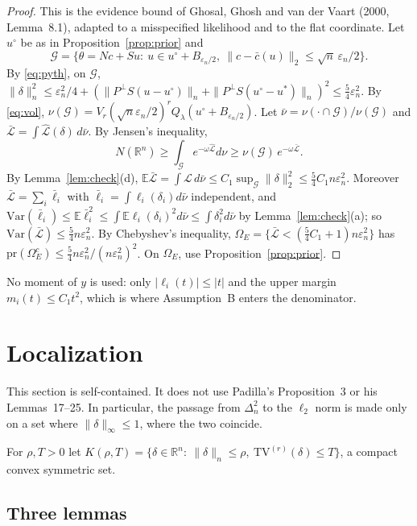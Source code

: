 \documentclass[11pt]{article}
\theoremstyle{definition}
\theoremstyle{remark}
\newcommand{\R}{\mathbb{R}}
\newcommand{\E}{\mathbb{E}}
\newcommand{\pr}{\mathrm{pr}}
\newcommand{\TV}{\mathrm{TV}}
\newcommand{\om}{\omega}
\newcommand{\en}{\varepsilon_n}
\newcommand{\Lh}{\widehat{\mathcal L}}
\newcommand{\Lm}{\mathcal L}
\newcommand{\Ql}{Q_\lambda}
\newcommand{\Pp}{P^{\perp}}
\newcommand{\nn}[1]{\|#1\|_n}
\begin{document}
\begin{proof}
This is the evidence bound of Ghosal, Ghosh and van der Vaart (2000, Lemma~8.1), adapted to a misspecified likelihood and to the flat coordinate. Let $u^\circ$ be as in Proposition~\ref{prop:prior} and
\[
\mathcal G=\bigl\{\theta=Nc+Su:\ u\in u^\circ+B_{\en/2},\ \|c-\bar c(u)\|_2\le\sqrt n\,\en/2\bigr\}.
\]
By \eqref{eq:pyth}, on $\mathcal G$, $\nn{\delta}^2\le\en^2/4+(\nn{\Pp S(u-u^\circ)}+\nn{\Pp S(u^\circ-u^{*})})^2\le\tfrac54\en^2$. By \eqref{eq:vol}, $\nu(\mathcal G)=V_r(\sqrt n\en/2)^r\Ql(u^\circ+B_{\en/2})$. Let $\bar\nu=\nu(\cdot\cap\mathcal G)/\nu(\mathcal G)$ and $\bar{\mathcal L}=\int\Lh(\delta)\,d\bar\nu$. By Jensen's inequality,
\[
N(\R^n)\ge\int_{\mathcal G}e^{-\om\Lh}d\nu\ge\nu(\mathcal G)\,e^{-\om\bar{\mathcal L}}.
\]
By Lemma~\ref{lem:check}(d), $\E\bar{\mathcal L}=\int\Lm\,d\bar\nu\le C_1\sup_{\mathcal G}\|\delta\|_2^2\le\tfrac54C_1n\en^2$. Moreover $\bar{\mathcal L}=\sum_i\bar\ell_i$ with $\bar\ell_i=\int\ell_i(\delta_i)d\bar\nu$ independent, and $\mathrm{Var}(\bar\ell_i)\le\E\bar\ell_i^2\le\int\E\ell_i(\delta_i)^2d\bar\nu\le\int\delta_i^2d\bar\nu$ by Lemma~\ref{lem:check}(a); so $\mathrm{Var}(\bar{\mathcal L})\le\tfrac54n\en^2$. By Chebyshev's inequality, $\Omega_E=\{\bar{\mathcal L}<(\tfrac54C_1+1)n\en^2\}$ has $\pr(\Omega_E^c)\le\tfrac54n\en^2/(n\en^2)^2$. On $\Omega_E$, use Proposition~\ref{prop:prior}.
\end{proof}

No moment of $y$ is used: only $|\ell_i(t)|\le|t|$ and the upper margin $m_i(t)\le C_1t^2$, which is where Assumption~B enters the denominator.

\section{Localization}\label{sec:local}

This section is self-contained. It does not use Padilla's Proposition~3 or his Lemmas~17--25. In particular, the passage from $\Delta_n^2$ to the $\ell_2$ norm is made only on a set where $\|\delta\|_\infty\le1$, where the two coincide.

For $\rho,T>0$ let $K(\rho,T)=\{\delta\in\R^n:\ \nn{\delta}\le\rho,\ \TV^{(r)}(\delta)\le T\}$, a compact convex symmetric set.

\subsection{Three lemmas}
\end{document}

